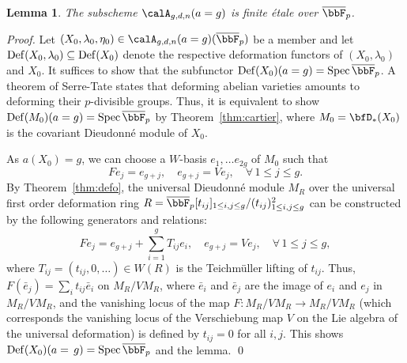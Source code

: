 \documentclass[]{amsart}
\theoremstyle{plain}
\newtheorem{lemma}[thm]{Lemma}
\theoremstyle{definition}
\theoremstyle{remark}
\def\Spec{{\rm Spec}\,}
\def\Fpbar{\overline{\bbF}_p}
\newcommand{\<}{\langle}   %
\renewcommand{\>}{\rangle} %
\newcommand{\dieu}{Dieudonn\'{e} }
\begin{document}

\begin{lemma}\label{lm:12}
    The subscheme $\calA_{g,d,n}(a=g)$ is finite \'etale over $\Fpbar$.
\end{lemma}
\begin{proof}
    Let $(X_0,\lambda_0,\eta_0)\in \calA_{g,d,n}(a=g)(\Fpbar)$ be a member and let ${\rm Def}(X_0,\lambda_0)\subseteq {\rm Def}(X_0)$ denote the respective deformation functors of $(X_0,\lambda_0)$ and $X_0$. It suffices to show that the subfunctor ${\rm Def}(X_0)(a=g)=\Spec \Fpbar$.
    A theorem of Serre-Tate states that deforming abelian varieties amounts to deforming their $p$-divisible groups. Thus, it is equivalent to show ${\rm Def}(M_0)(a=g)=\Spec \Fpbar$ by Theorem~\ref{thm:cartier},
    where $M_0=\bfD_*(X_0)$ is the covariant \dieu module of $X_0$. 

    As $a(X_0)=g$, we can choose a $W$-basis $e_1,\dots e_{2g}$ of $M_0$ such that 
    \[ F e_j=e_{g+j}, \quad e_{g+j}=V e_j, \quad \forall\, 1\le j\le g. \]
    By Theorem~\ref{thm:defo}, the universal \dieu module $M_R$ over the universal first order deformation ring $R=\Fpbar [t_{ij}]_{1\le i,j\le g}/(t_{ij})_{1\le i, j\le g}^2$ can be constructed by the following generators and relations:
    \[  F e_j=e_{g+j}+\sum_{i=1}^g T_{ij} e_i, \quad e_{g+j}=V e_j, \quad \forall\, 1\le j\le g, \]
    where $T_{ij}=(t_{ij},0,\dots)\in W(R)$ is the Teichm\"uller lifting of $t_{ij}$. Thus, $F(\bar e_j)=\sum_i t_{ij} \bar e_i$ on $M_R/VM_R$, where $\bar e_i$ and $\bar e_j$ are the image of $e_i$ and $e_j$ in $M_R/VM_R$, and the vanishing locus of the map $F: M_R/V M_R \to M_R/ V M_R$ (which corresponds the vanishing locus of the Verschiebung map $V$ on the Lie algebra of the universal deformation) is defined by $t_{ij}=0$ for all $i,j$. This shows ${\rm Def}(X_0)(a=~\!g)=\Spec \Fpbar$ and the lemma. \qed
\end{proof}






       
\end{document}
